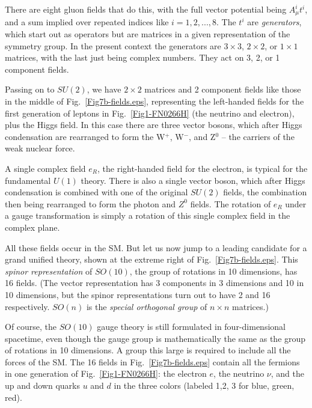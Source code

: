 \documentclass[12pt]{iopart}
\begin{document}
There are eight gluon fields that do this, with the full vector potential being $A^i_{\mu} t^i$, and a sum implied over repeated indices like $i=1, 2 ,..., 8$. The $t^i$ are \textit{generators}, which start out as operators but are matrices in a given representation of the symmetry group. In the present context the generators are $3 \times 3$, $2 \times 2$, or $1 \times 1$ matrices, with the last just being complex numbers. They act on 3, 2, or 1 component fields. 

Passing on to $SU \left( 2 \right)$, we have $2 \times 2$ matrices and 2 component fields like those in the middle of Fig.~\ref{Fig7b-fields.eps}, representing the left-handed fields for the first generation of leptons in Fig.~\ref{Fig1-FN0266H} (the neutrino and electron), plus the Higgs field. In this case there are three vector bosons, which after Higgs condensation are rearranged to form the W$^+$, W$^-$, and Z$^0$ -- the carriers of the weak nuclear force. 

A single complex field $e_R$, the right-handed field for the electron, is typical for the fundamental $U \left( 1 \right)$ theory. There is also a single vector boson, which after Higgs condensation is combined with one of the original $SU(2)$ fields, the combination then being rearranged to form the photon and $Z^0$ fields. The rotation of $e_R$ under a gauge transformation is simply a rotation of this single complex field in the complex plane.

All these fields occur in the SM. But let us now jump to a leading candidate for a grand unified theory, shown at the extreme right of Fig.~\ref{Fig7b-fields.eps}. This \textit{spinor representation} of $SO \left( 10 \right)$, the group of rotations in 10 dimensions, has 16 fields. (The vector representation has 3 components in 3 dimensions and 10 in 10  dimensions, but the spinor representations turn out to have 2 and 16 respectively. $SO \left( n \right)$ is the \textit{special orthogonal group} of $n \times n$ matrices.)

Of course, the $SO \left( 10 \right)$ gauge theory is still formulated in four-dimensional spacetime, even though the gauge group is mathematically the same as the group of rotations in 10 dimensions. A group this large is required to include all the forces of the SM. The 16 fields in Fig.~\ref{Fig7b-fields.eps} contain all the fermions in one generation of Fig.~\ref{Fig1-FN0266H}: the electron $e$, the neutrino $\nu$, and the up and down quarks $u$ and $d$ in the three colors (labeled 1,2, 3 for blue, green, red). 
\end{document}
